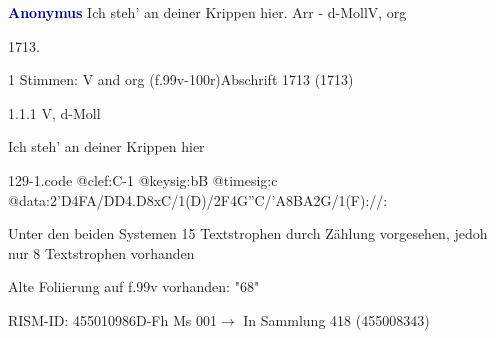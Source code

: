 \documentclass[twocolumn, 12pt]{book}
\begin{document}
\par \vspace{16pt} \textcolor{darkblue}{\textbf{Anonymus  }}\hfillplus{\textbf{[129]}}\newline Ich steh' an deiner Krippen hier. Arr - d-Moll\newline V, org
\par \begin{itshape} 1713.\end{itshape} 
\par \textcolor{darkblue}{}  1 Stimmen: V and org  (f.99v-100r)\newline Abschrift  1713 (1713)
\par 1.1.1  V, d-Moll\newline \begin{footnotesize} Ich steh' an deiner Krippen hier \end{footnotesize}  
\begin{filecontents*}{129-1.code}
@clef:C-1
@keysig:bB
@timesig:c
@data:2'D4FA/DD4.D8xC/1(D)/2F4G''C/'A{8BA}2G/1(F)://:
\end{filecontents*}
\newline %
\par Unter den beiden Systemen 15 Textstrophen durch Zählung vorgesehen, jedoh nur 8 Textstrophen vorhanden
\par Alte Foliierung auf f.99v vorhanden: "68"
\par RISM-ID: 455010986\newline D-Fh  Ms 001\newline $\rightarrow$ In Sammlung 418 (455008343)
      
\end{document}
